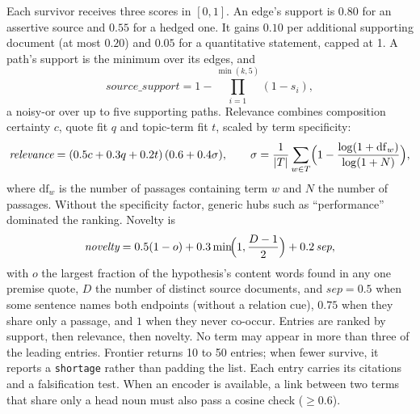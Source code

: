 \documentclass[11pt]{article}
\begin{document}
Each survivor receives three scores in $[0,1]$. An edge's support is $0.80$ for an assertive source and
$0.55$ for a hedged one. It gains $0.10$ per additional supporting document (at most $0.20$) and $0.05$ for a
quantitative statement, capped at 1. A path's support is the minimum over its edges, and
\begin{equation}
  \textit{source\_support} = 1 - \prod_{i=1}^{\min(k,5)} (1 - s_i),
\end{equation}
a noisy-or over up to five supporting paths. Relevance combines composition certainty $c$, quote fit $q$ and
topic-term fit $t$, scaled by term specificity:
\begin{equation}
  \textit{relevance} = (0.5c + 0.3q + 0.2t)\,(0.6 + 0.4\sigma), \qquad
  \sigma = \frac{1}{|T|}\sum_{w\in T}\Bigl(1 - \frac{\log(1+\mathrm{df}_w)}{\log(1+N)}\Bigr),
\end{equation}
where $\mathrm{df}_w$ is the number of passages containing term $w$ and $N$ the number of passages. Without the
specificity factor, generic hubs such as ``performance'' dominated the ranking. Novelty is
\begin{equation}
  \textit{novelty} = 0.5(1 - o) + 0.3\min\!\Bigl(1, \frac{D-1}{2}\Bigr) + 0.2\,\textit{sep},
\end{equation}
with $o$ the largest fraction of the hypothesis's content words found in any one premise quote, $D$ the number
of distinct source documents, and $\textit{sep}=0.5$ when some sentence names both endpoints (without a relation cue),
$0.75$ when they share only a passage, and $1$ when they never co-occur. Entries are ranked by support, then relevance, then novelty.
No term may appear in more than three of the leading entries. Frontier returns 10 to 50 entries; when fewer survive,
it reports a \texttt{shortage} rather than padding the list. Each entry carries its citations and a falsification
test. When an encoder is available, a link between two terms that share only a head noun must also pass a
cosine check ($\ge 0.6$).
\end{document}
